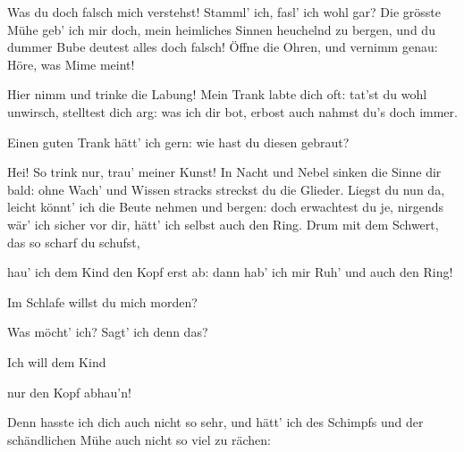 \begin{drama}
Was du doch falsch mich verstehst!
Stamml' ich, fasl' ich wohl gar?
Die grösste Mühe
geb' ich mir doch,
mein heimliches Sinnen
heuchelnd zu bergen,
und du dummer Bube
deutest alles doch falsch!
Öffne die Ohren,
und vernimm genau:
Höre, was Mime meint!


Hier nimm und trinke die Labung!
Mein Trank labte dich oft:
tat'st du wohl unwirsch,
stelltest dich arg:
was ich dir bot,
erbost auch nahmst du's doch immer.

\Siegfriedspeaks


Einen guten Trank
hätt' ich gern:
wie hast du diesen gebraut?

\Mimespeaks


Hei! So trink nur,
trau' meiner Kunst!
In Nacht und Nebel
sinken die Sinne dir bald:
ohne Wach' und Wissen
stracks streckst du die Glieder.
Liegst du nun da,
leicht könnt' ich
die Beute nehmen und bergen:
doch erwachtest du je,
nirgends wär' ich
sicher vor dir,
hätt' ich selbst auch den Ring.
Drum mit dem Schwert,
das so scharf du schufst,


hau' ich dem Kind
den Kopf erst ab:
dann hab' ich mir Ruh' und auch den Ring!


\Siegfriedspeaks

Im Schlafe willst du mich morden?

\Mimespeaks


Was möcht' ich? Sagt' ich denn das?


Ich will dem Kind


nur den Kopf abhau'n!


Denn hasste ich dich
auch nicht so sehr,
und hätt' ich des Schimpfs
und der schändlichen Mühe
auch nicht so viel zu rächen:


\end{drama}
